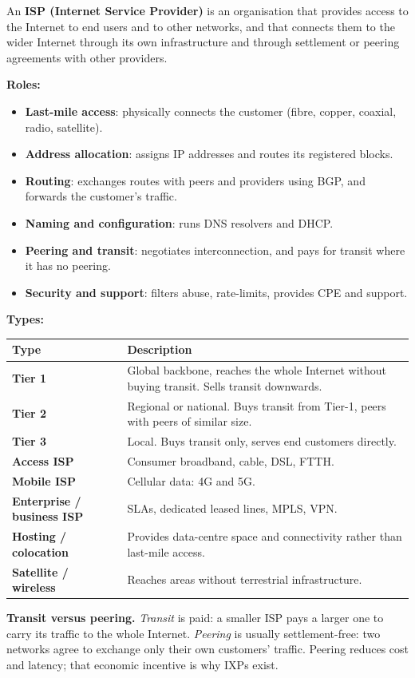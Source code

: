 \documentclass[11pt,a4paper]{article}
\begin{document}
\begin{solbox}
An \textbf{ISP (Internet Service Provider)} is an organisation that provides access to the Internet to end users and to other networks, and that connects them to the wider Internet through its own infrastructure and through settlement or peering agreements with other providers.

\textbf{Roles:}
\begin{itemize}
\item \textbf{Last-mile access}: physically connects the customer (fibre, copper, coaxial, radio, satellite).
\item \textbf{Address allocation}: assigns IP addresses and routes its registered blocks.
\item \textbf{Routing}: exchanges routes with peers and providers using BGP, and forwards the customer's traffic.
\item \textbf{Naming and configuration}: runs DNS resolvers and DHCP.
\item \textbf{Peering and transit}: negotiates interconnection, and pays for transit where it has no peering.
\item \textbf{Security and support}: filters abuse, rate-limits, provides CPE and support.
\end{itemize}

\textbf{Types:}
\begin{center}\small
\begin{tabularx}{\textwidth}{>{\bfseries}p{} X}
\toprule Type & Description\\
\midrule
Tier 1 & Global backbone, reaches the whole Internet without buying transit. Sells transit downwards.\\
Tier 2 & Regional or national. Buys transit from Tier-1, peers with peers of similar size.\\
Tier 3 & Local. Buys transit only, serves end customers directly.\\
Access ISP & Consumer broadband, cable, DSL, FTTH.\\
Mobile ISP & Cellular data: 4G and 5G.\\
Enterprise / business ISP & SLAs, dedicated leased lines, MPLS, VPN.\\
Hosting / colocation & Provides data-centre space and connectivity rather than last-mile access.\\
Satellite / wireless & Reaches areas without terrestrial infrastructure.\\
\bottomrule
\end{tabularx}
\end{center}

\textbf{Transit versus peering.} \emph{Transit} is paid: a smaller ISP pays a larger one to carry its traffic to the whole Internet. \emph{Peering} is usually settlement-free: two networks agree to exchange only their own customers' traffic. Peering reduces cost and latency; that economic incentive is why IXPs exist.
\end{solbox}
\end{document}
